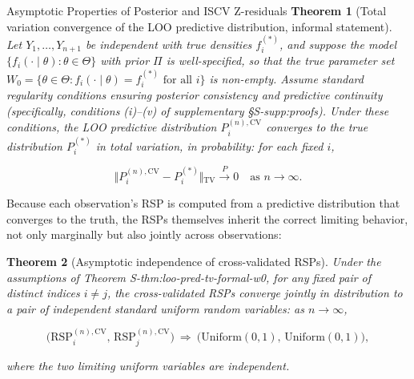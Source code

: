 \documentclass[
  ignorenonframetext,
]{beamer}
\begin{document}
\begin{frame}{Asymptotic Properties of Posterior and ISCV Z-residuals}
\protect{}\label{asymptotic-properties-of-posterior-and-iscv-z-residuals}
\textbf{Theorem 1} (Total variation convergence of the LOO predictive
distribution, informal statement). \emph{Let \(Y_1,\dots,Y_{n+1}\) be
independent with true densities \(f_i^{(*)}\), and suppose the model
\(\{f_i(\cdot\mid\theta):\theta\in\Theta\}\) with prior \(\Pi\) is
well-specified, so that the true parameter set
\(W_0=\{\theta\in\Theta: f_i(\cdot\mid\theta)=f_i^{(*)} \text{ for all } i\}\)
is non-empty. Assume standard regularity conditions ensuring posterior
consistency and predictive continuity (specifically, conditions (i)--(v)
of supplementary §S-supp:proofs). Under these conditions, the LOO
predictive distribution \(P_i^{(n),\mathrm{CV}}\) converges to the true
distribution \(P_i^{(*)}\) in total variation, in probability: for each
fixed \(i\),}

\[\big\Vert{}P_i^{(n),\mathrm{CV}}-P_i^{(*)}\big\Vert{}_{\mathrm{TV}} \xrightarrow{P} 0 \quad \text{as } n\to\infty.\]

Because each observation's RSP is computed from a predictive
distribution that converges to the truth, the RSPs themselves inherit
the correct limiting behavior, not only marginally but also jointly
across observations:

\textbf{Theorem 2} (Asymptotic independence of cross-validated RSPs).
\emph{Under the assumptions of Theorem S-thm:loo-pred-tv-formal-w0, for
any fixed pair of distinct indices \(i \neq j\), the cross-validated
RSPs converge jointly in distribution to a pair of independent standard
uniform random variables: as \(n\to\infty\),}

\[\big(\mathrm{RSP}_i^{(n),\mathrm{CV}},\, \mathrm{RSP}_j^{(n),\mathrm{CV}}\big) \ \Rightarrow\ \big(\mathrm{Uniform}(0,1),\,\mathrm{Uniform}(0,1)\big),\]

\emph{where the two limiting uniform variables are independent.}
\end{frame}
\end{document}

